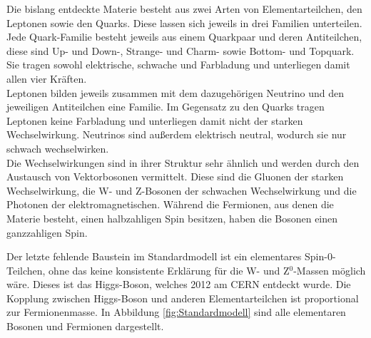 Die bislang entdeckte Materie besteht aus zwei Arten von Elementarteilchen, den Leptonen sowie den Quarks. Diese lassen sich jeweils in drei Familien unterteilen. Jede Quark-Familie besteht jeweils aus einem Quarkpaar und deren Antiteilchen, diese sind Up- und Down-, Strange- und Charm- sowie Bottom- und Topquark. Sie tragen sowohl elektrische, schwache und Farbladung und unterliegen damit allen vier Kr\"aften.\\
Leptonen bilden jeweils zusammen mit dem dazugeh\"origen Neutrino und den jeweiligen Antiteilchen eine Familie. Im Gegensatz zu den Quarks tragen Leptonen keine Farbladung und unterliegen damit nicht der starken Wechselwirkung. Neutrinos sind au\ss erdem elektrisch neutral, wodurch sie nur schwach wechselwirken.\\
Die Wechselwirkungen sind in ihrer Struktur sehr \"ahnlich und werden durch den Austausch von Vektorbosonen vermittelt. Diese sind die Gluonen der starken Wechselwirkung, die W- und Z-Bosonen der schwachen Wechselwirkung und die Photonen der elektromagnetischen. W\"ahrend die Fermionen, aus denen die Materie besteht, einen halbzahligen Spin besitzen, haben die Bosonen einen ganzzahligen Spin.

Der letzte fehlende Baustein im Standardmodell ist ein elementares Spin-0-Teilchen, ohne das keine konsistente Erkl\"arung f\"ur die W- und Z$^0$-Massen m\"oglich w\"are. Dieses ist das Higgs-Boson, welches 2012 am CERN entdeckt wurde. Die Kopplung zwischen Higgs-Boson und anderen Elementarteilchen ist proportional zur Fermionenmasse. In Abbildung \ref{fig:Standardmodell} sind alle elementaren Bosonen und Fermionen dargestellt.


